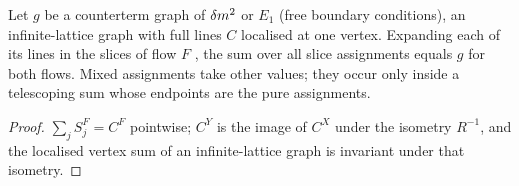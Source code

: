 \begin{lemma}\label{rot:lem:ctsame}
Let $g$ be a counterterm graph of $\delta m^2$ or $E_1$ (free boundary conditions), an infinite-lattice graph with full lines $C$ localised at one vertex. Expanding each of its lines in the slices of flow $F$ \cite[(3.76)]{K1}, the sum over all slice assignments equals $g$ for both flows. Mixed assignments take other values; they occur only inside a telescoping sum whose endpoints are the pure assignments.
\end{lemma}
\begin{proof}
$\sum_jS^F_j=C^F$ pointwise; $C^Y$ is the image of $C^X$ under the isometry $R^{-1}$, and the localised vertex sum of an infinite-lattice graph is invariant under that isometry.
\end{proof}
